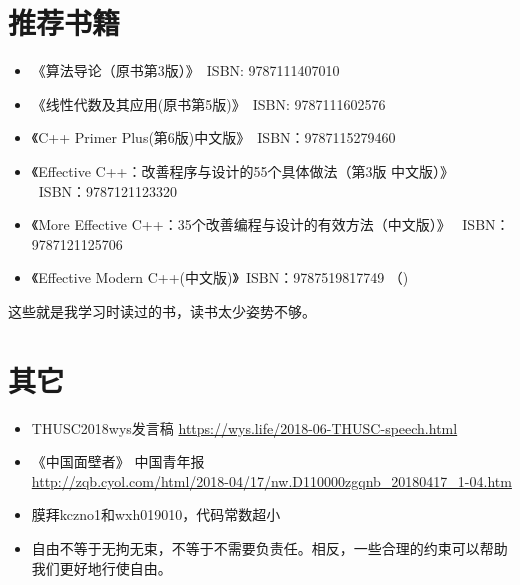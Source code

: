 \section{推荐书籍}
\begin{itemize}
    \item 《算法导论（原书第3版）》~ISBN: 9787111407010
    \item 《线性代数及其应用(原书第5版)》~ISBN: 9787111602576
    \item 《C++ Primer Plus(第6版)中文版》~ISBN：9787115279460
    \item 《Effective C++：改善程序与设计的55个具体做法（第3版 中文版）》
    ~ISBN：9787121123320
    \item 《More Effective C++：35个改善编程与设计的有效方法（中文版）》
    ~ISBN：9787121125706
    \item 《Effective Modern C++(中文版)》~ISBN：9787519817749
    （)
\end{itemize}

这些就是我学习时读过的书，读书太少姿势不够。
\section{其它}
\begin{itemize}
    \item THUSC2018wys发言稿 \url{https://wys.life/2018-06-THUSC-speech.html}
    \item 《中国面壁者》 中国青年报\\
    {\footnotesize \url{http://zqb.cyol.com/html/2018-04/17/nw.D110000zgqnb\_20180417\_1-04.htm}}
    \item 膜拜kczno1和wxh019010，代码常数超小
    \item 自由不等于无拘无束，不等于不需要负责任。相反，一些合理的约束可以帮助我们更好地行使自由。
\end{itemize}
